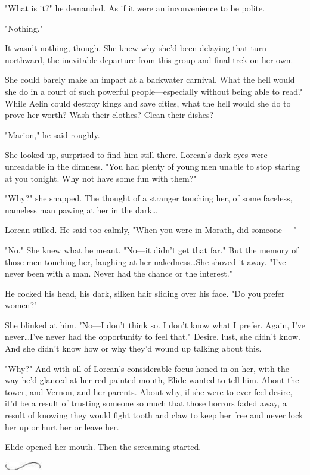 "What is it?"
he demanded.
As if it were an inconvenience to be polite.

"Nothing."

It wasn't nothing, though.
She knew why she'd been delaying that turn northward, the inevitable departure from this group and final trek on her own.

She could barely make an impact at a backwater carnival.
What the hell would she do in a court of such powerful people---especially without being able to read?
While Aelin could destroy kings and save cities, what the hell would she do to prove her worth?
Wash their clothes?
Clean their dishes?

"Marion," he said roughly.

She looked up, surprised to find him still there.
Lorcan's dark eyes were unreadable in the dimness.
"You had plenty of young men unable to stop staring at you tonight.
Why not have some fun with them?"

"Why?"
she snapped.
The thought of a stranger touching her, of some faceless, nameless man pawing at her in the dark\ldots{}

Lorcan stilled.
He said too calmly, "When you were in Morath, did someone ---"

"No."
She knew what he meant.
"No---it didn't get that far."
But the memory of those men touching her, laughing at her nakedness\ldots She shoved it away.
"I've never been with a man.
Never had the chance or the interest."

He cocked his head, his dark, silken hair sliding over his face.
"Do you prefer women?"

She blinked at him.
"No---I don't think so.
I don't know what I prefer.
Again, I've never\ldots I've never had the opportunity to feel  that."
Desire, lust, she didn't know.
And she didn't know how or why they'd wound up talking about this.

"Why?"
And with all of Lorcan's considerable focus honed in on her, with the way he'd glanced at her red-painted mouth, Elide wanted to tell him.
About the tower, and Vernon, and her parents.
About why, if she were to ever feel desire, it'd be a result of trusting someone so much that those horrors faded away, a result of knowing they would fight tooth and claw to keep her free and never lock her up or hurt her or leave her.

Elide opened her mouth.
Then the screaming started.

\begin{center}
	\includegraphics[width=0.65in,height=0.13in]{images/seperator}
\end{center}

